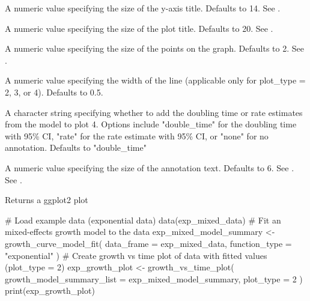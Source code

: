 \documentclass[a4paper]{book}
\begin{document}
\begin{Arguments}
\begin{ldescription}
\item[\code{y\_axis\_title\_size}] A numeric value specifying the size of the
y-axis title. Defaults to 14. See .

\item[\code{plot\_title\_size}] A numeric value specifying the size of the plot
title. Defaults to 20. See .

\item[\code{geom\_point\_size}] A numeric value specifying the size of the points
on the graph. Defaults to 2. See .

\item[\code{geom\_line\_width}] A numeric value specifying the width of the line
(applicable only for plot\_type = 2, 3, or 4). Defaults to 0.5.

\item[\code{ci\_plot\_annoate\_value}] A character string specifying whether to add
the doubling time or rate estimates from the model to plot 4. Options
include "double\_time" for the doubling time with 95\% CI, "rate" for the
rate estimate with 95\% CI, or "none" for no annotation. Defaults to
"double\_time"

\item[\code{annotate\_value\_text\_size}] A numeric value specifying the size of
the annotation text. Defaults to 6. See .
See .
\end{ldescription}
\end{Arguments}
%
\begin{Value}
Returns a ggplot2 plot
\end{Value}
%
\begin{SeeAlso}
\end{SeeAlso}
%
\begin{Examples}
\begin{ExampleCode}
# Load example data (exponential data)
data(exp_mixed_data)
# Fit an mixed-effects growth model to the data
exp_mixed_model_summary <- growth_curve_model_fit(
  data_frame = exp_mixed_data,
  function_type = "exponential"
)
# Create growth vs time plot of data with fitted values (plot_type = 2)
exp_growth_plot <- growth_vs_time_plot(
  growth_model_summary_list = exp_mixed_model_summary,
  plot_type = 2
)
print(exp_growth_plot)
\end{ExampleCode}
\end{Examples}
\end{document}
